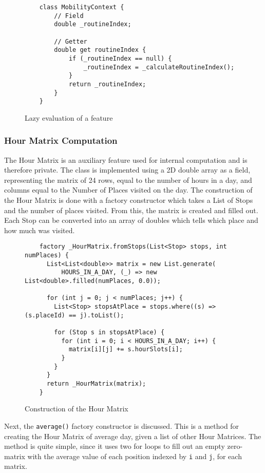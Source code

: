 \begin{figure}
    \centering
    \begin{verbatim}
    class MobilityContext {
        // Field
        double _routineIndex;
        
        // Getter
        double get routineIndex {
            if (_routineIndex == null) {
                _routineIndex = _calculateRoutineIndex();
            }
            return _routineIndex;
        }
    }
    \end{verbatim}
    \caption{Lazy evaluation of a feature}
    \label{fig:lazy-evaluation}
\end{figure}

\subsubsection{Hour Matrix Computation}
The Hour Matrix is an auxiliary feature used for internal computation and is therefore private. The class is implemented using a 2D double array as a field, representing the matrix of 24 rows, equal to the number of hours in a day, and columns equal to the Number of Places visited on the day. The construction of the Hour Matrix is done with a factory constructor which takes a List of Stops and the number of places visited. From this, the matrix is created and filled out. Each Stop can be converted into an array of doubles which tells which place and how much was visited.

\begin{figure}
    \centering
    \begin{verbatim}
    factory _HourMatrix.fromStops(List<Stop> stops, int numPlaces) {
      List<List<double>> matrix = new List.generate(
          HOURS_IN_A_DAY, (_) => new List<double>.filled(numPlaces, 0.0));
    
      for (int j = 0; j < numPlaces; j++) {
        List<Stop> stopsAtPlace = stops.where((s) => (s.placeId) == j).toList();
    
        for (Stop s in stopsAtPlace) {
          for (int i = 0; i < HOURS_IN_A_DAY; i++) {
            matrix[i][j] += s.hourSlots[i];
          }
        }
      }
      return _HourMatrix(matrix);
    }
    \end{verbatim}
    \caption{Construction of the Hour Matrix}
    \label{fig:hour-matrix-construction}
\end{figure}

Next, the \verb|average()| factory constructor is discussed. This is a method for creating the Hour Matrix of average day, given a list of other Hour Matrices. The method is quite simple, since it uses two for loops to fill out an empty zero-matrix with the average value of each position indexed by \verb|i| and \verb|j|, for each matrix.

